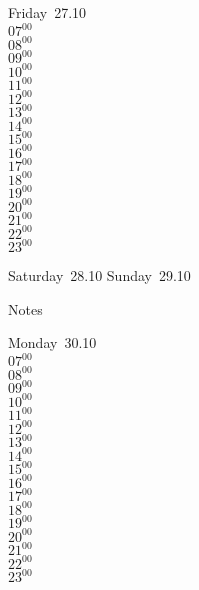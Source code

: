 \documentclass[11pt, a4paper]{book}\usepackage[]{graphicx}\usepackage[]{color}
\begin{document}
\begin{weekdaybox}
  Friday~27.10\\
  { 
  \vfill
  $07^{00}$\\
$08^{00}$\\
$09^{00}$\\
$10^{00}$\\
$11^{00}$\\
$12^{00}$\\
$13^{00}$\\
$14^{00}$\\
$15^{00}$\\
$16^{00}$\\
$17^{00}$\\
$18^{00}$\\
$19^{00}$\\
$20^{00}$\\
$21^{00}$\\
$22^{00}$\\
$23^{00}$\\
  }
\end{weekdaybox}
\begin{weekendbox}
  Saturday~28.10
  \tcblower
  Sunday~29.10
\end{weekendbox} %
\begin{notebox}
  Notes
\end{notebox}
\clearpage
\begin{headerbox}
\end{headerbox}
\begin{weekdaybox}
  Monday~30.10\\
  { 
  \vfill
  $07^{00}$\\
$08^{00}$\\
$09^{00}$\\
$10^{00}$\\
$11^{00}$\\
$12^{00}$\\
$13^{00}$\\
$14^{00}$\\
$15^{00}$\\
$16^{00}$\\
$17^{00}$\\
$18^{00}$\\
$19^{00}$\\
$20^{00}$\\
$21^{00}$\\
$22^{00}$\\
$23^{00}$\\
  }
\end{weekdaybox}
\end{document}
